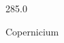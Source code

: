 \documentclass[12pt]{article}
\begin{document}
\hfill{}
\vfill
\begin{center}
  {\fontsize{50}{60}
  }

  \vspace{1em}

  285.0

Copernicium
\end{center}
\vfill
\end{document}
